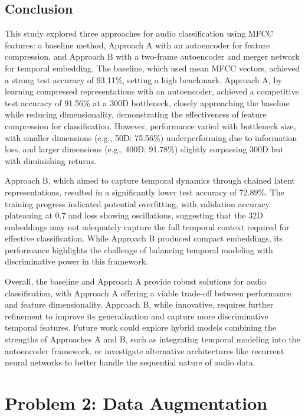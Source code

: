 \documentclass[12pt]{article}
\begin{document}
\subsection{Conclusion}

This study explored three approaches for audio classification using MFCC features: a baseline method, Approach A with an autoencoder for feature compression, and Approach B with a two-frame autoencoder and merger network for temporal embedding. The baseline, which used mean MFCC vectors, achieved a strong test accuracy of 93.11\%, setting a high benchmark. Approach A, by learning compressed representations with an autoencoder, achieved a competitive test accuracy of 91.56\% at a 300D bottleneck, closely approaching the baseline while reducing dimensionality, demonstrating the effectiveness of feature compression for classification. However, performance varied with bottleneck size, with smaller dimensions (e.g., 50D: 75.56\%) underperforming due to information loss, and larger dimensions (e.g., 400D: 91.78\%) slightly surpassing 300D but with diminishing returns.

Approach B, which aimed to capture temporal dynamics through chained latent representations, resulted in a significantly lower test accuracy of 72.89\%. The training progress indicated potential overfitting, with validation accuracy plateauing at 0.7 and loss showing oscillations, suggesting that the 32D embeddings may not adequately capture the full temporal context required for effective classification. While Approach B produced compact embeddings, its performance highlights the challenge of balancing temporal modeling with discriminative power in this framework.

Overall, the baseline and Approach A provide robust solutions for audio classification, with Approach A offering a viable trade-off between performance and feature dimensionality. Approach B, while innovative, requires further refinement to improve its generalization and capture more discriminative temporal features. Future work could explore hybrid models combining the strengths of Approaches A and B, such as integrating temporal modeling into the autoencoder framework, or investigate alternative architectures like recurrent neural networks to better handle the sequential nature of audio data.



\newpage
\section{Problem 2: Data Augmentation}
\end{document}
